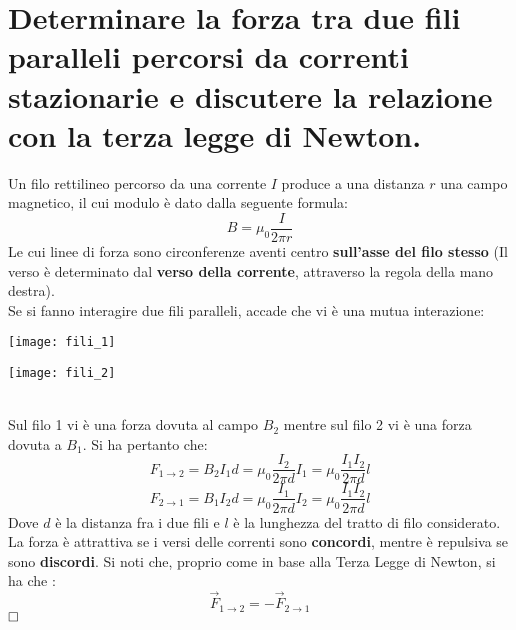 \section{Determinare la forza tra due fili paralleli percorsi da
	correnti stazionarie e discutere la relazione con la terza
	legge di Newton.}
Un filo rettilineo percorso da una corrente $I$ produce a una distanza $r$ una campo magnetico, il cui modulo \`e dato dalla seguente formula:
\begin{equation}
 	B = \mu_0 \frac{I}{2 \pi r}
\end{equation}
Le cui linee di forza sono circonferenze aventi centro \textbf{sull'asse del filo stesso} (Il verso \`e determinato dal \textbf{verso della corrente}, attraverso la regola della mano destra).\\
Se si fanno interagire due fili paralleli, accade che vi \`e una mutua interazione: 

\noindent\begin{minipage}{0.4\textwidth}
	\texttt{[image: fili\_1]}
\end{minipage}
\hfill%
\begin{minipage}{0.4\textwidth}\raggedleft
	\texttt{[image: fili\_2]}
\end{minipage}\\
 Sul filo 1 vi \`e una forza dovuta al campo $B_2$ mentre sul filo 2 vi \`e una forza dovuta a $B_1$. Si ha pertanto che:
 $$
     F_{1 \rightarrow 2} = B_2 I_1 d = \mu_0 \frac{I_2}{2 \pi d}I_1 = \mu_0 \frac{I_1 I_2}{2 \pi d}l
 $$
 $$
     F_{2 \rightarrow 1} = B_1 I_2 d = \mu_0 \frac{I_1}{2 \pi d}I_2 = \mu_0 \frac{I_1 I_2}{2 \pi d}l
 $$
 Dove $d$ \`e la distanza fra i due fili e $l$ \`e la lunghezza del tratto di filo considerato.\\
 La forza \`e attrattiva se i versi delle correnti sono \textbf{concordi}, mentre \`e repulsiva se sono \textbf{discordi}.
 Si noti che, proprio come in base alla Terza Legge di Newton, si ha che :
 $$
     \vec{F}_{1 \rightarrow 2} = -\vec{F}_{2 \rightarrow 1}
 $$
 $\hfill\square$